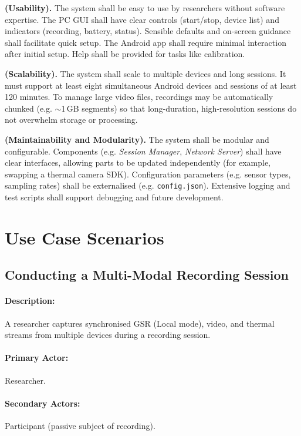 \documentclass{report}
\begin{document}
\begin{description}[leftmargin=0cm]
        \item \textbf{(Usability).} The system shall be easy to use by researchers without software expertise. The PC GUI shall have clear controls (start/stop, device list) and indicators (recording, battery, status). Sensible defaults and on-screen guidance shall facilitate quick setup. The Android app shall require minimal interaction after initial setup. Help shall be provided for tasks like calibration.

        \item \textbf{(Scalability).} The system shall scale to multiple devices and long sessions. It must support at least eight simultaneous Android devices and sessions of at least 120 minutes. To manage large video files, recordings may be automatically chunked (e.g. $\sim$1\,GB segments) so that long-duration, high-resolution sessions do not overwhelm storage or processing.

        \item \textbf{(Maintainability and Modularity).} The system shall be modular and configurable. Components (e.g. \textit{Session Manager}, \textit{Network Server}) shall have clear interfaces, allowing parts to be updated independently (for example, swapping a thermal camera SDK). Configuration parameters (e.g. sensor types, sampling rates) shall be externalised (e.g. \texttt{config.json}). Extensive logging and test scripts shall support debugging and future development.
    \end{description}

    \section{Use Case Scenarios}

    \subsection{Conducting a Multi-Modal Recording Session}
    \paragraph{Description:} A researcher captures synchronised GSR (Local mode), video, and thermal streams from multiple devices during a recording session.
    \paragraph{Primary Actor:} Researcher.
    \paragraph{Secondary Actors:} Participant (passive subject of recording).
\end{document}
